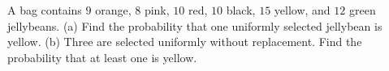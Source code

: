 A bag contains $9$ orange, $8$ pink, $10$ red, $10$ black, $15$ yellow, and $12$ green jellybeans. (a) Find the probability that one uniformly selected jellybean is yellow. (b) Three are selected uniformly without replacement. Find the probability that at least one is yellow.
